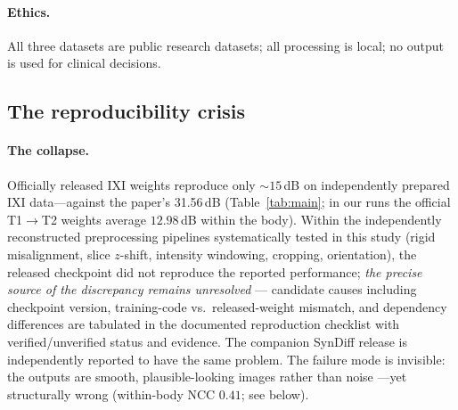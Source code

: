 \documentclass[11pt]{article}
\begin{document}
\paragraph{Ethics.}
All three datasets are public research datasets; all processing is local; no
output is used for clinical decisions.

\subsection{The reproducibility crisis}
\label{sec:exp-repro}
\paragraph{The collapse.}
Officially released IXI weights reproduce only ${\sim}15$\,dB on independently
prepared IXI data---against the paper's 31.56\,dB (Table~\ref{tab:main}; in
our runs the official T1$\to$T2 weights average $12.98$\,dB within the body).
Within the independently reconstructed preprocessing pipelines systematically
tested in this study (rigid misalignment, slice $z$-shift, intensity
windowing, cropping, orientation), the released checkpoint did not reproduce
the reported performance; \emph{the precise source of the discrepancy remains
unresolved} --- candidate causes including checkpoint version, training-code
vs.\ released-weight mismatch, and dependency differences are tabulated in the
documented reproduction checklist with verified/unverified status and
evidence. The companion SynDiff release is independently reported to have the
same problem. The failure mode is invisible: the outputs are smooth,
plausible-looking images rather than noise
---yet structurally wrong (within-body NCC $0.41$; see below).
\end{document}
